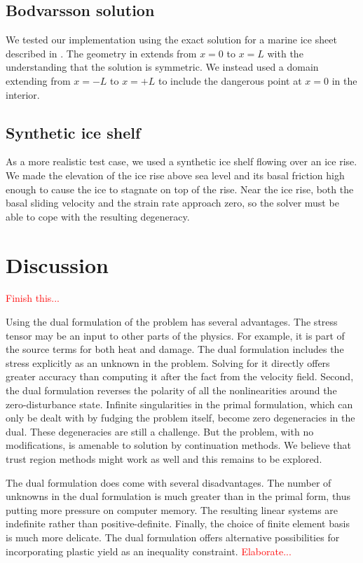 \documentclass{article}
\theoremstyle{definition}
\theoremstyle{plain}
\begin{document}
\subsection{Bodvarsson solution}

We tested our implementation using the exact solution for a marine ice sheet described in \citet{bueler2014exact}.
The geometry in \citet{bueler2014exact} extends from $x = 0$ to $x = L$ with the understanding that the solution is symmetric.
We instead used a domain extending from $x = -L$ to $x = +L$ to include the dangerous point at $x = 0$ in the interior.

\subsection{Synthetic ice shelf}

As a more realistic test case, we used a synthetic ice shelf flowing over an ice rise.
We made the elevation of the ice rise above sea level and its basal friction high enough to cause the ice to stagnate on top of the rise.
Near the ice rise, both the basal sliding velocity and the strain rate approach zero, so the solver must be able to cope with the resulting degeneracy.


\section{Discussion}

\textcolor{red}{Finish this...}

Using the dual formulation of the problem has several advantages.
The stress tensor may be an input to other parts of the physics.
For example, it is part of the source terms for both heat and damage.
The dual formulation includes the stress explicitly as an unknown in the problem.
Solving for it directly offers greater accuracy than computing it after the fact from the velocity field.
Second, the dual formulation reverses the polarity of all the nonlinearities around the zero-disturbance state.
Infinite singularities in the primal formulation, which can only be dealt with by fudging the problem itself, become zero degeneracies in the dual.
These degeneracies are still a challenge.
But the problem, with no modifications, is amenable to solution by continuation methods.
We believe that trust region methods might work as well and this remains to be explored.

The dual formulation does come with several disadvantages.
The number of unknowns in the dual formulation is much greater than in the primal form, thus putting more pressure on computer memory.
The resulting linear systems are indefinite rather than positive-definite.
Finally, the choice of finite element basis is much more delicate.
The dual formulation offers alternative possibilities for incorporating plastic yield as an inequality constraint.
\textcolor{red}{Elaborate...}



\pagebreak



\end{document}
